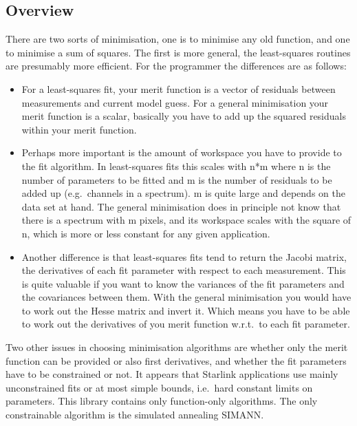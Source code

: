 
\subsection{Overview}

   There are two sorts of minimisation, one is to minimise any old
   function, and one to minimise a sum of squares. The first is more
   general, the least-squares routines are presumably more efficient.
   For the programmer the differences are as follows:

\begin{itemize}
\item 
   For a least-squares fit, your merit function is a vector of residuals
   between measurements and current model guess.
   For a general minimisation your merit function is a scalar, basically
   you have to add up the squared residuals within your merit function.
\item 
   Perhaps more important is the amount of workspace you have to
   provide to the fit algorithm. In least-squares fits this scales with
   n*m where n is the number of parameters to be fitted and m is the
   number of residuals to be added up (e.g.\ channels in a spectrum).
   m is quite large and depends on the data set at hand. The general
   minimisation does in principle not know that there is a spectrum with
   m pixels, and its workspace scales with the square of n, which is
   more or less constant for any given application.
\item 
   Another difference is that least-squares fits tend to return the
   Jacobi matrix, the derivatives of each fit parameter with respect to
   each measurement. This is quite valuable if you want to know the
   variances of the fit parameters and the covariances between them. With
   the general minimisation you would have to work out the Hesse matrix
   and invert it. Which means you have to be able to work out the
   derivatives of you merit function w.r.t.\ to each fit parameter.
\end{itemize}

   Two other issues in choosing minimisation algorithms are whether only
   the merit function can be provided or also first derivatives, and
   whether the fit parameters have to be constrained or not. It appears
   that Starlink applications use mainly unconstrained fits or at most
   simple bounds, i.e.\ hard constant limits on parameters. This library
   contains only function-only algorithms. The only constrainable
   algorithm is the simulated annealing SIMANN.

